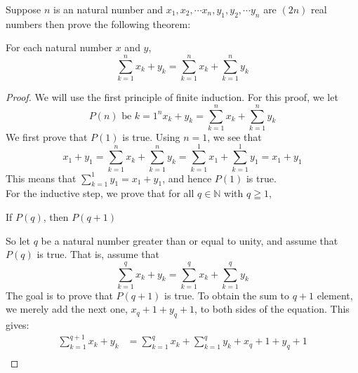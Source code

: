 \newpage
\begin{example}
Suppose $n$ is an natural number and $x_1, x_2, \cdots x_n, y_1, y_2, \cdots y_n$ are $(2n)$ real numbers then prove the following theorem:
    
    \begin{tcolorbox}
        \begin{theorem}
            For each natural number $x$ and $y$,
                \begin{equation*}
                    \sum_{k=1}^{n}{x_k + y_k} = \sum_{k=1}^{n}{x_k} + \sum_{k=1}^{n}{y_k}                
                \end{equation*}
        \end{theorem}
    \end{tcolorbox}

    \begin{proof}
        We will use the first principle of finite induction. For this proof, we let
            \begin{equation*}
                P(n) \text{ be } {k=1}^{n}{x_k + y_k} = \sum_{k=1}^{n}{x_k} + \sum_{k=1}^{n}{y_k} 
            \end{equation*}
        We first prove that $P(1)$ is true. Using $n=1$, we see that
            \begin{equation*}
                x_1 + y_1 = \sum_{k=1}^{n}{x_k} + \sum_{k=1}^{n}{y_k}  = \sum_{k=1}^{1}{x_1} + \sum_{k=1}^{1}{y_1}  = x_1 + y_1
            \end{equation*}
        This means that $\sum_{k=1}^{1}{y_1}  = x_1 + y_1$, and hence $P(1)$ is true. \\
        For the inductive step, we prove that for all $q \in \mathbb{N}$ with $q \geqq 1$, 
            \begin{center}
                If $P(q)$, then $P(q+1)$
            \end{center}
        So let $q$ be a natural number greater than or equal to unity, and assume that $P(q)$ is true. That is, assume that 
            \begin{equation*}
               \sum_{k=1}^{q}{x_k + y_k} = \sum_{k=1}^{q}{x_k} + \sum_{k=1}^{q}{y_k}
            \end{equation*}
        The goal is to prove that $P(q+1)$ is true. To obtain the sum to $q+1$ element, we merely add the next one, $x_q+1 + y_q+1$, to both sides of the equation. This gives: 
            \begin{align*}
                \sum_{k=1}^{q+1}{x_k + y_k} & = \sum_{k=1}^{q}{x_k} + \sum_{k=1}^{q}{y_k} + x_q+1 + y_q+1 \\

\end{align*}
\end{proof}
\end{example}
